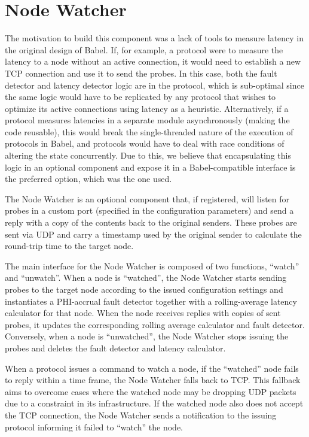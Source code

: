 \section{Node Watcher} \label{sec:Node-Watcher}

The motivation to build this component was a lack of tools to measure latency in the original design of Babel. If, for example, a protocol were to measure the latency to a node without an active connection, it would need to establish a new TCP connection and use it to send the probes. In this case, both the fault detector and latency detector logic are in the protocol, which is sub-optimal since the same logic would have to be replicated by any protocol that wishes to optimize its active connections using latency as a heuristic. Alternatively, if a protocol measures latencies in a separate module asynchronously (making the code reusable), this would break the single-threaded nature of the execution of protocols in Babel, and protocols would have to deal with race conditions of altering the state concurrently. Due to this, we believe that encapsulating this logic in an optional component and expose it in a Babel-compatible interface is the preferred option, which was the one used.

The Node Watcher is an optional component that, if registered, will listen for probes in a custom port (specified in the configuration parameters) and send a reply with a copy of the contents back to the original senders. These probes are sent via UDP and carry a timestamp used by the original sender to calculate the round-trip time to the target node.

The main interface for the Node Watcher is composed of two functions, ``watch'' and ``unwatch''. When a node is ``watched'', the Node Watcher starts sending probes to the target node according to the issued configuration settings and instantiates a PHI-accrual fault detector \cite{phi-accrual-fd} together with a rolling-average latency calculator for that node.  When the node receives replies with copies of sent probes, it updates the corresponding rolling average calculator and fault detector. Conversely, when a node is ``unwatched'', the Node Watcher stops issuing the probes and deletes the fault detector and latency calculator.

When a protocol issues a command to watch a node, if the ``watched'' node fails to reply within a time frame, the Node Watcher falls back to TCP. This fallback aims to overcome cases where the watched node may be dropping UDP packets due to a constraint in its infrastructure. If the watched node also does not accept the TCP connection, the Node Watcher sends a notification to the issuing protocol informing it failed to ``watch'' the node.

